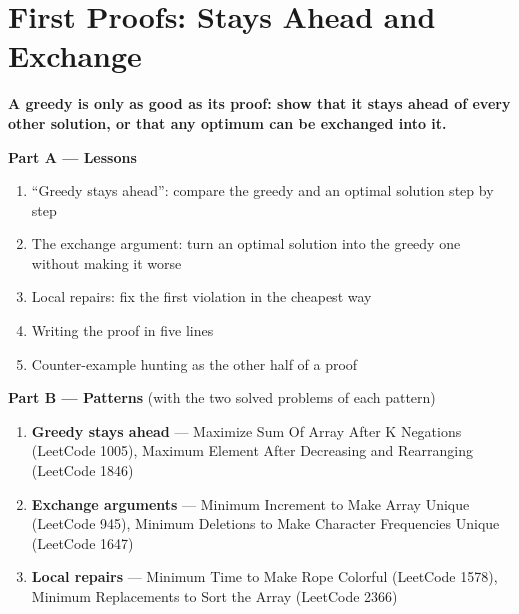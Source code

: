 \chapter{First Proofs: Stays Ahead and Exchange}
\label{ch:proofs_basic}

\begin{tcolorbox}[enhanced, colback=white, colframe=secondaryblue, boxrule=1pt, arc=2mm]
\textbf{\large\textcolor{primaryblue}{A greedy is only as good as its proof: show that it stays ahead of every other solution, or that any optimum can be exchanged into it.}}
\end{tcolorbox}


\begin{plannedbox}
\textbf{Part A --- Lessons}
\begin{enumerate}[leftmargin=*, label=\textbf{A\arabic*.}, itemsep=1pt]
    \item ``Greedy stays ahead'': compare the greedy and an optimal solution step by step
    \item The exchange argument: turn an optimal solution into the greedy one without making it worse
    \item Local repairs: fix the first violation in the cheapest way
    \item Writing the proof in five lines
    \item Counter-example hunting as the other half of a proof
\end{enumerate}
\textbf{Part B --- Patterns} (with the two solved problems of each pattern)
\begin{enumerate}[leftmargin=*, label=\textbf{P\arabic*.}, itemsep=1pt]
    \item \textbf{Greedy stays ahead} --- Maximize Sum Of Array After K Negations {\small\color{darkgray}(LeetCode 1005)}, Maximum Element After Decreasing and Rearranging {\small\color{darkgray}(LeetCode 1846)}
    \item \textbf{Exchange arguments} --- Minimum Increment to Make Array Unique {\small\color{darkgray}(LeetCode 945)}, Minimum Deletions to Make Character Frequencies Unique {\small\color{darkgray}(LeetCode 1647)}
    \item \textbf{Local repairs} --- Minimum Time to Make Rope Colorful {\small\color{darkgray}(LeetCode 1578)}, Minimum Replacements to Sort the Array {\small\color{darkgray}(LeetCode 2366)}
\end{enumerate}
\end{plannedbox}
